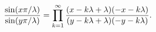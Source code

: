 \begin{equation}
\frac{\sin (x\pi /\lambda )}{\sin (y\pi /\lambda )}=\prod\limits_{k=1}^{%
\infty }\frac{(x-k\lambda +\lambda )(-x-k\lambda )}{(y-k\lambda +\lambda
)(-y-k\lambda )}.  \label{sin}
\end{equation}%
